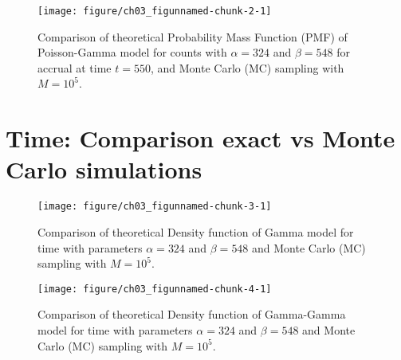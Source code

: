 \begin{figure}
\begin{knitrout}
\color{fgcolor}
\texttt{[image: figure/ch03\_figunnamed-chunk-2-1]} 
\end{knitrout}
\caption{Comparison of theoretical Probability Mass Function (PMF) of Poisson-Gamma model for counts with $\alpha = 324$ and $\beta = 548$ for accrual at time $t=550$, and Monte Carlo (MC) sampling with $M=10^5$.}
\label{fig:3_2}
\end{figure}



\section{Time: Comparison exact vs Monte Carlo simulations}
% 
% 

\begin{figure}
\begin{knitrout}
\color{fgcolor}
\texttt{[image: figure/ch03\_figunnamed-chunk-3-1]} 
\end{knitrout}
\caption{Comparison of theoretical Density function of Gamma model for time with parameters $\alpha = 324$ and $\beta = 548$ and Monte Carlo (MC) sampling with $M=10^5$.}
\label{fig:3_3}
\end{figure}


\begin{figure}
\begin{knitrout}
\color{fgcolor}
\texttt{[image: figure/ch03\_figunnamed-chunk-4-1]} 
\end{knitrout}
\caption{Comparison of theoretical Density function of Gamma-Gamma model for time with parameters $\alpha = 324$ and $\beta = 548$ and Monte Carlo (MC) sampling with $M=10^5$.}
\label{fig:3_4}
\end{figure}


